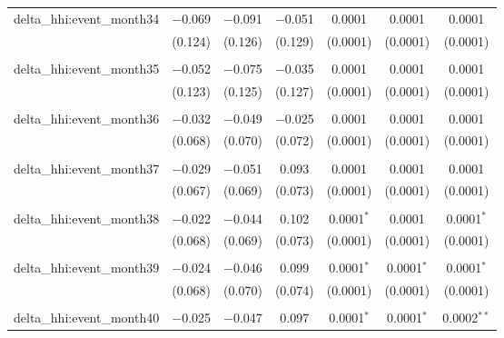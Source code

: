 \begin{table}[H]
{\begin{tabular}{@{\extracolsep{5pt}}lcccccc}
  delta\_hhi:event\_month34 & $-$0.069 & $-$0.091 & $-$0.051 & 0.0001 & 0.0001 & 0.0001 \\  

   & (0.124) & (0.126) & (0.129) & (0.0001) & (0.0001) & (0.0001) \\  

   & & & & & & \\  

  delta\_hhi:event\_month35 & $-$0.052 & $-$0.075 & $-$0.035 & 0.0001 & 0.0001 & 0.0001 \\  

   & (0.123) & (0.125) & (0.127) & (0.0001) & (0.0001) & (0.0001) \\  

   & & & & & & \\  

  delta\_hhi:event\_month36 & $-$0.032 & $-$0.049 & $-$0.025 & 0.0001 & 0.0001 & 0.0001 \\  

   & (0.068) & (0.070) & (0.072) & (0.0001) & (0.0001) & (0.0001) \\  

   & & & & & & \\  

  delta\_hhi:event\_month37 & $-$0.029 & $-$0.051 & 0.093 & 0.0001 & 0.0001 & 0.0001 \\  

   & (0.067) & (0.069) & (0.073) & (0.0001) & (0.0001) & (0.0001) \\  

   & & & & & & \\  

  delta\_hhi:event\_month38 & $-$0.022 & $-$0.044 & 0.102 & 0.0001$^{*}$ & 0.0001 & 0.0001$^{*}$ \\  

   & (0.068) & (0.069) & (0.073) & (0.0001) & (0.0001) & (0.0001) \\  

   & & & & & & \\  

  delta\_hhi:event\_month39 & $-$0.024 & $-$0.046 & 0.099 & 0.0001$^{*}$ & 0.0001$^{*}$ & 0.0001$^{*}$ \\  

   & (0.068) & (0.070) & (0.074) & (0.0001) & (0.0001) & (0.0001) \\  

   & & & & & & \\  

  delta\_hhi:event\_month40 & $-$0.025 & $-$0.047 & 0.097 & 0.0001$^{*}$ & 0.0001$^{*}$ & 0.0002$^{**}$ \\  


\end{tabular}}
\end{table}
